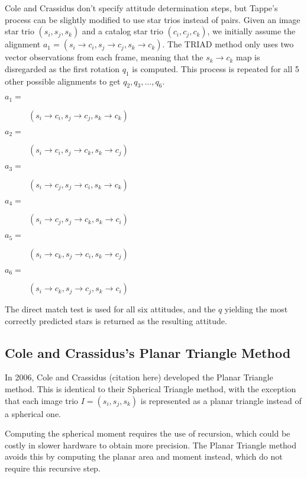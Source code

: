 Cole and Crassidus don't specify attitude determination steps, but Tappe's process can be slightly modified to use star trios instead of pairs. Given an image star trio $(s_i, s_j, s_k)$ and a catalog star trio $(c_i, c_j, c_k)$, we initially assume the alignment $a_1 = (s_i \rightarrow c_i, s_j \rightarrow c_j, s_k \rightarrow c_k)$. The TRIAD method only uses two vector observations from each frame, meaning that the $s_k \rightarrow c_k$ map is disregarded as the first rotation $q_1$ is computed. This process is repeated for all 5 other possible alignments to get $q_2, q_3, ..., q_6$.
\begin{description}
\item [$a_1 = $] $(s_i \rightarrow c_i, s_j \rightarrow c_j, s_k \rightarrow c_k)$
\item [$a_2 = $] $(s_i \rightarrow c_i, s_j \rightarrow c_k, s_k \rightarrow c_j)$
\item [$a_3 = $] $(s_i \rightarrow c_j, s_j \rightarrow c_i, s_k \rightarrow c_k)$
\item [$a_4 = $] $(s_i \rightarrow c_j, s_j \rightarrow c_k, s_k \rightarrow c_i)$
\item [$a_5 = $] $(s_i \rightarrow c_k, s_j \rightarrow c_i, s_k \rightarrow c_j)$
\item [$a_6 = $] $(s_i \rightarrow c_k, s_j \rightarrow c_j, s_k \rightarrow c_i)$
\end{description}

The direct match test is used for all six attitudes, and the $q$ yielding the most correctly predicted stars is returned as the resulting attitude.

\subsection{Cole and Crassidus's Planar Triangle Method}
In 2006, Cole and Crassidus (citation here) developed the Planar Triangle method. This is identical to their Spherical Triangle method, with the exception that each image trio $I = (s_i, s_j, s_k)$ is represented as a planar triangle instead of a spherical one. 

Computing the spherical moment requires the use of recursion, which could be costly in slower hardware to obtain more precision. The Planar Triangle method avoids this by computing the planar area and moment instead, which do not require this recursive step.

